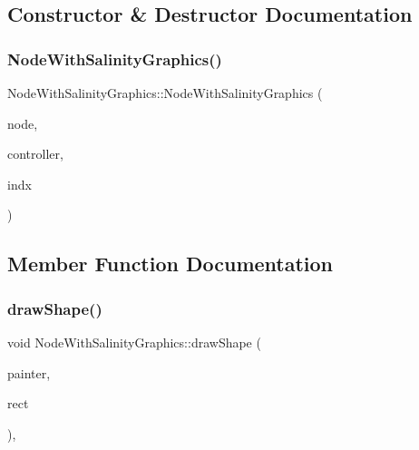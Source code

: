 \subsection{Constructor \& Destructor Documentation}
\mbox{\label{class_node_with_salinity_graphics_a5e87590c189c79794ba31f0e33ba9750}} 
\subsubsection{\texorpdfstring{NodeWithSalinityGraphics()}{NodeWithSalinityGraphics()}}
{\footnotesize\ttfamily Node\+With\+Salinity\+Graphics\+::\+Node\+With\+Salinity\+Graphics (\begin{DoxyParamCaption}\item[{\mbox{\hyperlink{class_node_data}{Node\+Data}} $\ast$}]{node,  }\item[{\mbox{\hyperlink{class_map_objects_controller}{Map\+Objects\+Controller}} $\ast$}]{controller,  }\item[{int}]{indx }\end{DoxyParamCaption})\hspace{0.3cm}{\ttfamily [inline]}}



\subsection{Member Function Documentation}
\mbox{\label{class_node_with_salinity_graphics_aae2e7137f5cefd4715066d84ce1a3d7a}} 
\subsubsection{\texorpdfstring{drawShape()}{drawShape()}}
{\footnotesize\ttfamily void Node\+With\+Salinity\+Graphics\+::draw\+Shape (\begin{DoxyParamCaption}\item[{Q\+Painter \&}]{painter,  }\item[{const qmapcontrol\+::\+Rect\+World\+Px \&}]{rect }\end{DoxyParamCaption})\hspace{0.3cm}{\ttfamily [protected]}, {\ttfamily [virtual]}}



